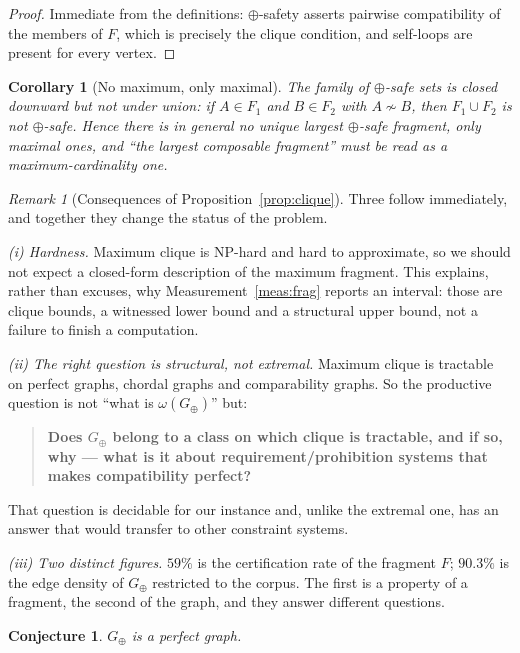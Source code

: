\documentclass[11pt]{article}
\theoremstyle{definition}
\theoremstyle{plain}
\newtheorem{corollary}[definition]{Corollary}
\newtheorem{conjecture}[definition]{Conjecture}
\theoremstyle{remark}
\newtheorem{remark}[definition]{Remark}
\begin{document}
\begin{proof}
Immediate from the definitions: $\oplus$-safety asserts pairwise compatibility of
the members of $F$, which is precisely the clique condition, and self-loops are
present for every vertex.
\end{proof}

\begin{corollary}[No maximum, only maximal]\label{cor:nomax}
The family of $\oplus$-safe sets is closed downward but not under union: if
$A \in F_1$ and $B \in F_2$ with $A \not\sim B$, then $F_1 \cup F_2$ is not
$\oplus$-safe. Hence there is in general no unique largest $\oplus$-safe
fragment, only maximal ones, and ``the largest composable fragment'' must be read
as a maximum-cardinality one.
\end{corollary}

\begin{remark}[Consequences of Proposition~\ref{prop:clique}]
Three follow immediately, and together they change the status of the problem.

\emph{(i) Hardness.} Maximum clique is NP-hard and hard to approximate, so we
should not expect a closed-form description of the maximum fragment. This
explains, rather than excuses, why Measurement~\ref{meas:frag} reports an
interval: those are clique bounds, a witnessed lower bound and a structural upper
bound, not a failure to finish a computation.

\emph{(ii) The right question is structural, not extremal.} Maximum clique is
tractable on perfect graphs, chordal graphs and comparability graphs. So the
productive question is not ``what is $\omega(G_\oplus)$'' but:
\begin{quote}
  \textbf{Does $G_\oplus$ belong to a class on which clique is tractable, and if
  so, why --- what is it about requirement/prohibition systems that makes
  compatibility perfect?}
\end{quote}
That question is decidable for our instance and, unlike the extremal one, has an
answer that would transfer to other constraint systems.

\emph{(iii) Two distinct figures.} $59\%$ is the certification rate of the
fragment $F$; $90.3\%$ is the edge density of $G_\oplus$ restricted to the corpus.
The first is a property of a fragment, the second of the graph, and they answer
different questions.
\end{remark}

\begin{conjecture}\label{conj:perfect}
$G_\oplus$ is a perfect graph.
\end{conjecture}
\end{document}
